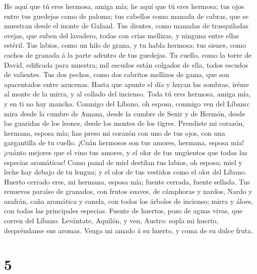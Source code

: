  He aquí que tú eres hermosa, amiga mía; he aquí que tú eres
hermosa; tus ojos entre tus guedejas como de paloma; tus cabellos como
manada de cabras, que se muestran desde el monte de Galaad. 
Tus dientes, como manadas de trasquiladas ovejas, que suben del
lavadero, todas con crías mellizas, y ninguna entre ellas estéril.
 Tus labios, como un hilo de grana, y tu habla hermosa; tus
sienes, como cachos de granada á la parte adentro de tus guedejas.
 Tu cuello, como la torre de David, edificada para muestra;
mil escudos están colgados de ella, todos escudos de valientes.
 Tus dos pechos, como dos cabritos mellizos de gama, que son
apacentados entre azucenas.  Hasta que apunte el día y huyan
las sombras, iréme al monte de la mirra, y al collado del incienso.
 Toda tú eres hermosa, amiga mía, y en ti no hay mancha.
 Conmigo del Líbano, oh esposa, conmigo ven del Líbano: mira
desde la cumbre de Amana, desde la cumbre de Senir y de Hermón, desde
las guaridas de los leones, desde los montes de los tigres. 
Prendiste mi corazón, hermana, esposa mía; has preso mi corazón con uno
de tus ojos, con una gargantilla de tu cuello.  ¡Cuán
hermosos son tus amores, hermana, esposa mía! ¡cuánto mejores que el
vino tus amores, y el olor de tus ungüentos que todas las especias
aromáticas!  Como panal de miel destilan tus labios, oh
esposa; miel y leche hay debajo de tu lengua; y el olor de tus vestidos
como el olor del Líbano.  Huerto cerrado eres, mi hermana,
esposa mía; fuente cerrada, fuente sellada.  Tus renuevos
paraíso de granados, con frutos suaves, de cámphoras y nardos,
 Nardo y azafrán, caña aromática y canela, con todos los
árboles de incienso; mirra y áloes, con todas las principales especias.
 Fuente de huertos, pozo de aguas vivas, que corren del
Líbano.  Levántate, Aquilón, y ven, Austro: sopla mi
huerto, despréndanse sus aromas. Venga mi amado á su huerto, y coma de
su dulce fruta.

\hypertarget{section-4}{%
\section{5}\label{section-4}}


